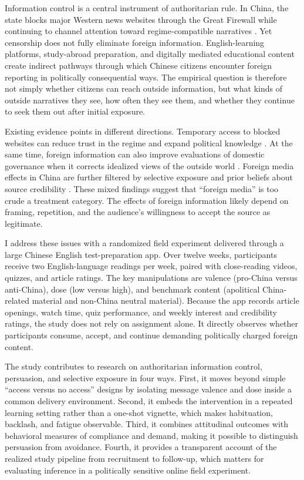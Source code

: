 \documentclass[12pt,american]{article}
\begin{document}
Information control is a central instrument of authoritarian rule. In China, the state blocks major Western news websites through the Great Firewall while continuing to channel attention toward regime-compatible narratives \citep{kingpanroberts2013,roberts2018}. Yet censorship does not fully eliminate foreign information. English-learning platforms, study-abroad preparation, and digitally mediated educational content create indirect pathways through which Chinese citizens encounter foreign reporting in politically consequential ways. The empirical question is therefore not simply whether citizens can reach outside information, but what kinds of outside narratives they see, how often they see them, and whether they continue to seek them out after initial exposure.

Existing evidence points in different directions. Temporary access to blocked websites can reduce trust in the regime and expand political knowledge \citep{chenyang2019}. At the same time, foreign information can also improve evaluations of domestic governance when it corrects idealized views of the outside world \citep{huang2015international}. Foreign media effects in China are further filtered by selective exposure and prior beliefs about source credibility \citep{huangyeh2017,wangwestwood2024}. These mixed findings suggest that ``foreign media'' is too crude a treatment category. The effects of foreign information likely depend on framing, repetition, and the audience's willingness to accept the source as legitimate.

I address these issues with a randomized field experiment delivered through a large Chinese English test-preparation app. Over twelve weeks, participants receive two English-language readings per week, paired with close-reading videos, quizzes, and article ratings. The key manipulations are valence (pro-China versus anti-China), dose (low versus high), and benchmark content (apolitical China-related material and non-China neutral material). Because the app records article openings, watch time, quiz performance, and weekly interest and credibility ratings, the study does not rely on assignment alone. It directly observes whether participants consume, accept, and continue demanding politically charged foreign content.

The study contributes to research on authoritarian information control, persuasion, and selective exposure in four ways. First, it moves beyond simple ``access versus no access'' designs by isolating message valence and dose inside a common delivery environment. Second, it embeds the intervention in a repeated learning setting rather than a one-shot vignette, which makes habituation, backlash, and fatigue observable. Third, it combines attitudinal outcomes with behavioral measures of compliance and demand, making it possible to distinguish persuasion from avoidance. Fourth, it provides a transparent account of the realized study pipeline from recruitment to follow-up, which matters for evaluating inference in a politically sensitive online field experiment.
\end{document}
